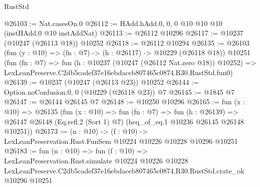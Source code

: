 \begin{lexlean}{RustStd}
\begin{coremodule}
@26103 := Nat.casesOn.{0}
@26112 := HAdd.hAdd.{0, 0, 0} @10 @10 @10 (instHAdd.{0} @10 instAddNat)
@26113 := @26112 @10296
@26117 := @10237 (@10247 (@26113 @18)) @10252
@26118 := @26112 @10294
@26135 := @26103
    (fun (y : @10) => (fn : @7) -> (h : @26117) -> @10229 (@26118 @18))
    @10251
    (fun (fn : @7) =>
    fun (h : @10237 (@10247 (@26112 Nat.zero @18)) @10252) =>
    LexLeanPreserve.C2db5cadef37e16ebdaceb807465c0874.R30.RustStd.fun0)
@26139 := @10237 (@10247 (@26113 @23)) @10252
@26144 := Option.noConfusion.{0, 0} (@10229 (@26118 @23)) @7
@26145 := @1845 @7
@26147 := @26144 @26145 @7
@26148 := @10250 @10296
@26165 := fun (x : @10) =>
  @26135
    (fun (x : @10) =>
    fun (fn : @7) =>
    fun (h : @26139) =>
    @26147 @26148 (Eq.refl.{2} (Sort 1) @7) (heq_of_eq.{1} @10236 @26145 @26148 @10251))
@26173 := (n : @10) ->
  (f : @10) -> LexLeanPreservation.Rust.FunSem @10224 @10226 @10228 @10296 @10251
@26183 := fun (n : @10) =>
  fun (f : @10) =>
  LexLeanPreservation.Rust.simulate
    @10224
    @10226
    @10228
    LexLeanPreserve.C2db5cadef37e16ebdaceb807465c0874.R30.RustStd.crate_ok
    @10296
    @10251
\end{coremodule}
\end{lexlean}
